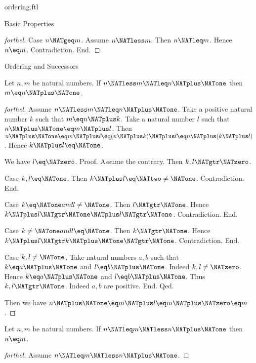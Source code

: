 \documentclass{naproche-library}
\begin{document}
\begin{smodule}[title=The Standard Ordering of the Natural Numbers]{ordering.ftl}
\begin{sfragment}{Basic Properties}
\begin{proof}[forthel]
    Case $n \NATgeq m$.
      Assume $n \NATless m$.
      Then $n \NATleq m$.
      Hence $n \eq m$.
      Contradiction.
    End.
  \end{proof}
\end{sfragment}

\begin{sfragment}{Ordering and Successors}
  \begin{proposition}[forthel,id=ARITHMETIC_04_7006203091615744]
    Let $n, m$ be natural numbers.
    If $n \NATless m \NATleq n \NATplus \NATone$ then $m \eq n \NATplus \NATone$.
  \end{proposition}
  \begin{proof}[forthel]
    Assume $n \NATless m \NATleq n \NATplus \NATone$.
    Take a positive natural number $k$ such that $m \eq n \NATplus k$.
    Take a natural number $l$ such that $n \NATplus \NATone \eq m \NATplus l$.
    Then $n \NATplus \NATone
      \eq m \NATplus l
      \eq (n \NATplus k) \NATplus l
      \eq n \NATplus (k \NATplus l)$.
    Hence $k \NATplus l \eq \NATone$.

    We have $l \eq \NATzero$. \newline
    Proof.
      Assume the contrary.
      Then $k,l \NATgtr \NATzero$.

      Case $k,l \eq \NATone$.
        Then $k \NATplus l
          \eq \NATtwo
          \neq \NATone$.
        Contradiction.
      End.

      Case $k \eq \NATone and l \neq \NATone$.
        Then $l \NATgtr \NATone$.
        Hence $k \NATplus l
          \NATgtr \NATone \NATplus l
          \NATgtr \NATone$.
        Contradiction.
      End.

      Case $k \neq \NATone and l \eq \NATone$.
        Then $k \NATgtr \NATone$.
        Hence $k \NATplus l
          \NATgtr k \NATplus \NATone
          \NATgtr \NATone$.
        Contradiction.
      End.

      Case $k, l \neq \NATone$.
        Take natural numbers $a, b$ such that $k \eq a \NATplus \NATone$ and $l \eq b \NATplus \NATone$.
        Indeed $k, l \neq \NATzero$.
        Hence $k \eq a \NATplus \NATone$ and $l \eq b \NATplus \NATone$.
        Thus $k, l \NATgtr \NATone$. Indeed $a, b$ are positive.
      End.
    Qed.

    Then we have $n \NATplus \NATone
      \eq m \NATplus l
      \eq m \NATplus \NATzero
      \eq m$.
  \end{proof}

  \begin{proposition}[forthel,id=ARITHMETIC_04_8792330561650688]
    Let $n, m$ be natural numbers.
    If $n \NATleq m \NATless n \NATplus \NATone$ then $n \eq m$.
  \end{proposition}
  \begin{proof}[forthel]
    Assume $n \NATleq m \NATless n \NATplus \NATone$.


\end{proof}
\end{sfragment}
\end{smodule}
\end{document}
